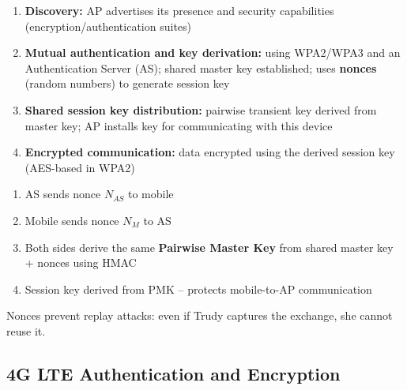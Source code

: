 \begin{tcolorbox}[keybox, title=802.11 Security -- 4-Step Process]
\begin{enumerate}[noitemsep]
  \item \textbf{Discovery:} AP advertises its presence and security capabilities (encryption/authentication suites)
  \item \textbf{Mutual authentication and key derivation:} using WPA2/WPA3 and an Authentication Server (AS); shared master key established; uses \textbf{nonces} (random numbers) to generate session key
  \item \textbf{Shared session key distribution:} pairwise transient key derived from master key; AP installs key for communicating with this device
  \item \textbf{Encrypted communication:} data encrypted using the derived session key (AES-based in WPA2)
\end{enumerate}
\end{tcolorbox}

\begin{tcolorbox}[formulabox, title=WPA2 Key Derivation Using Nonces]
\begin{enumerate}[noitemsep]
  \item AS sends nonce $N_{AS}$ to mobile
  \item Mobile sends nonce $N_M$ to AS
  \item Both sides derive the same \textbf{Pairwise Master Key} from shared master key + nonces using HMAC
  \item Session key derived from PMK -- protects mobile-to-AP communication
\end{enumerate}
Nonces prevent replay attacks: even if Trudy captures the exchange, she cannot reuse it.
\end{tcolorbox}

\subsection{4G LTE Authentication and Encryption}

